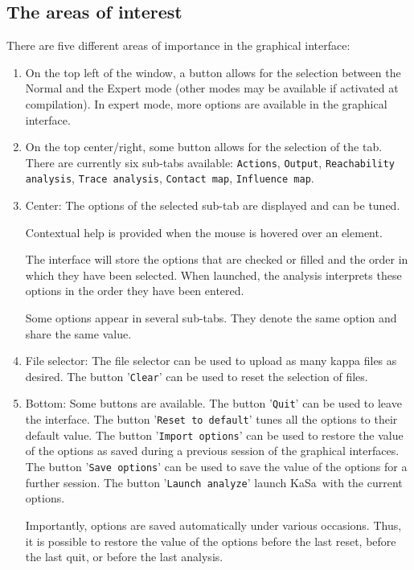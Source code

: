 \documentclass[11pt]{book}
\def\KaSa{\textsf{KaSa}}
\begin{document}
\subsection{The areas of interest}

There are five different areas of importance in the graphical interface:
\begin{enumerate}
\item On the top left of the window, a button allows for the selection between the Normal and the Expert mode (other modes may be available if activated at compilation).
In expert mode, more options are available in the graphical interface.
\item On the top center/right, some button allows for the selection of the tab. There are currently six sub-tabs available: \texttt{Actions}, \texttt{Output}, \texttt{Reachability analysis}, \texttt{Trace analysis}, \texttt{Contact map}, \texttt{Influence map}.

\item Center: The options of the selected sub-tab are displayed and can be tuned.

Contextual help is provided when the mouse is hovered over an element.

The interface will store the options that are checked or filled and the order in which they have been selected.
When launched, the analysis interprets these options in the order they have been entered.

Some options appear in several sub-tabs. They denote the same option and share the same value.

\item File selector: The file selector can be used to upload as many kappa files as desired. The button '\texttt{Clear}' can be used to reset the selection of files.
\item Bottom: Some buttons are available. The button '\texttt{Quit}' can be used to leave the interface. The button '\texttt{Reset to default}' tunes all the options to their default value. The button '\texttt{Import options}' can be used to restore the value of the options as saved during a previous session of the graphical interfaces. The button '\texttt{Save options}' can be used to save the value of the options for a further session. The button '\texttt{Launch analyze}' launch \KaSa\ with the current options.

Importantly, options are saved automatically under various occasions. Thus, it is possible to restore the value of the options
before the last reset, before the last quit, or before the last analysis.
\end{enumerate}
\end{document}
